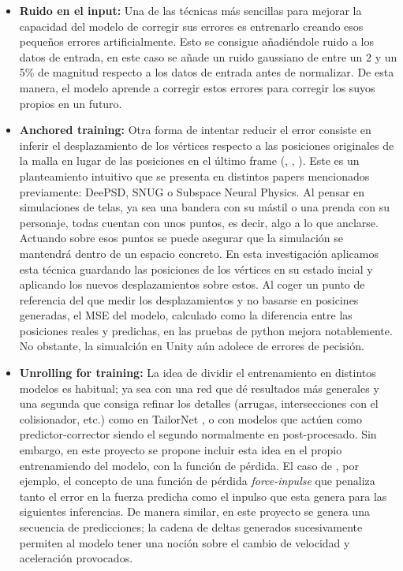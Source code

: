 \begin{itemize}
    \item \textbf{Ruido en el input:} Una de las técnicas más sencillas para mejorar la capacidad del modelo de corregir sus errores es entrenarlo creando esos pequeños errores artificialmente. Esto se consigue añadiéndole ruido a los datos de entrada, en este caso se añade un ruido gaussiano de entre un 2 y un 5\% de magnitud respecto a los datos de entrada antes de normalizar. De esta manera, el modelo aprende a corregir estos errores para corregir los suyos propios en un futuro.

    \item \textbf{Anchored training:} Otra forma de intentar reducir el error consiste en inferir el desplazamiento de los vértices respecto a las posiciones originales de la malla en lugar de las posiciones en el último frame (\cite{bertiche_deepsd_2021}, \cite{santesteban2022snug}, \cite{holden_subspace_2019}). Este es un planteamiento intuitivo que se presenta en distintos papers mencionados previamente: DeePSD, SNUG o Subspace Neural Physics. Al pensar en simulaciones de telas, ya sea una bandera con su mástil o una prenda con su personaje, todas cuentan con unos puntos, es decir, algo a lo que anclarse. Actuando sobre esos puntos se puede asegurar que la simulación se mantendrá dentro de un espacio concreto. En esta investigación aplicamos esta técnica guardando las posiciones de los vértices en su estado incial y aplicando los nuevos desplazamientos sobre estos.
    Al coger un punto de referencia del que medir los desplazamientos y no basarse en posicines generadas, el MSE del modelo, calculado como la diferencia entre las posiciones reales y predichas, en las pruebas de python mejora notablemente. No obstante, la simualción en Unity aún adolece de errores de pecisión.
        
    \item \textbf{Unrolling for training:} La idea de dividir el entrenamiento en distintos modelos es habitual; ya sea con una red que dé resultados más generales y una segunda que consiga refinar los detalles (arrugas, intersecciones con el colisionador, etc.) como en TailorNet \cite{patel2020tailornet}, o con modelos que actúen como predictor-corrector siendo el segundo normalmente en post-procesado. Sin embargo, en este proyecto se propone incluir esta idea en el propio entrenamiendo del modelo, con la función de pérdida. El caso de \cite{chen2025learning}, por ejemplo, el concepto de una función de pérdida \textit{force-inpulse} que penaliza tanto el error en la fuerza predicha como el inpulso que esta genera para las siguientes inferencias. De manera similar, en este proyecto se genera una secuencia de predicciones; la cadena de deltas generados sucesivamente permiten al modelo tener una noción sobre el cambio de velocidad y aceleración provocados. \newline
    

\end{itemize}
